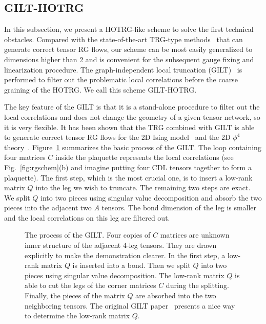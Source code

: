 \documentclass[aps,prr,reprint,superscriptaddress,floatfix]{revtex4-2}
\begin{document}
\subsection{GILT-HOTRG\label{sec:gilthotrg}}
In this subsection, we present a HOTRG-like scheme to solve the first technical obstacles.
Compared with the state-of-the-art TRG-type methods~\cite{GuWen2009,tnr,tnralgo,tnrplus,looptnr,harada2018,fet,tns,tensor-ring,gilts} that can generate correct tensor RG flows, our scheme can be most easily generalized to dimensions higher than 2 and is convenient for the subsequent gauge fixing and linearization procedure.
The graph-independent local truncation (GILT)~\cite{gilts} is performed to filter out the problematic local correlations before the coarse graining of the HOTRG\@.
We call this scheme GILT-HOTRG\@.
%

The key feature of the GILT is that it is a stand-alone procedure to filter out the local correlations and does not change the geometry of a given tensor network, so it is very flexible.
It has been shown that the TRG combined with GILT is able to generate correct tensor RG flows for the 2D Ising model~\cite{gilts} and the 2D $\phi^4$ theory~\cite{Delcamp2020}.
Figure~\ref{fig:gilt} summarizes the basic process of the GILT. 
The loop containing four matrices $C$ inside the plaquette represents the local correlations (see Fig.~\ref{fig:rgschem}(b) and imagine putting four CDL tensors together to form a plaquette). 
The first step, which is the most crucial one, is to insert a low-rank matrix $Q$ into the leg we wish to truncate. 
The remaining two steps are exact. We split $Q$ into two pieces using singular value decomposition and absorb the two pieces into the adjacent two $A$ tensors. 
The bond dimension of the leg is smaller and the local correlations on this leg are filtered out. 
%
%
\begin{figure}[t]
    \caption{\label{fig:gilt}
        The process of the GILT. 
        Four copies of $C$ matrices are unknown inner structure of the adjacent 4-leg tensors.
        They are drawn explicitly to make the demonstration clearer.
        In the first step, a low-rank matrix $Q$ is inserted into a bond. Then we split $Q$ into two pieces using singular value decomposition. 
        The low-rank matrix $Q$ is able to cut the legs of the corner matrices $C$ during the splitting. Finally, the pieces of the matrix $Q$ are absorbed into the two neighboring tensors. 
        The original GILT paper~\cite{gilts} presents a nice way to determine the
low-rank matrix $Q$.}
\end{figure}
%
\end{document}
